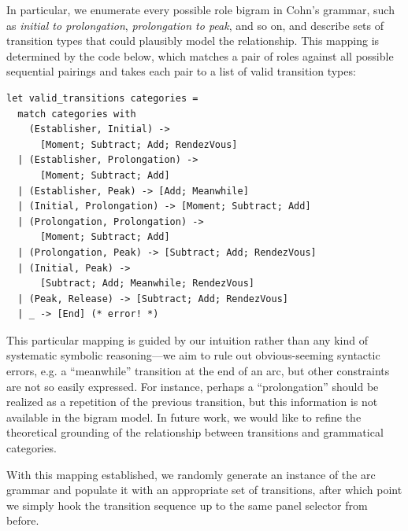 
In particular, we enumerate every possible role bigram in Cohn's grammar,
such as {\em initial to prolongation}, {\em prolongation to peak}, and so
on, and describe sets of transition types that could plausibly model the
relationship. This mapping is determined by the code below, which matches a
pair of roles against all possible sequential pairings and takes each pair
to a list of valid transition types:

\begin{Verbatim}[fontsize=\scriptsize]
let valid_transitions categories =
  match categories with
    (Establisher, Initial) -> 
      [Moment; Subtract; Add; RendezVous]
  | (Establisher, Prolongation) -> 
      [Moment; Subtract; Add]
  | (Establisher, Peak) -> [Add; Meanwhile]
  | (Initial, Prolongation) -> [Moment; Subtract; Add]
  | (Prolongation, Prolongation) -> 
      [Moment; Subtract; Add]
  | (Prolongation, Peak) -> [Subtract; Add; RendezVous]
  | (Initial, Peak) -> 
      [Subtract; Add; Meanwhile; RendezVous]
  | (Peak, Release) -> [Subtract; Add; RendezVous]
  | _ -> [End] (* error! *)
\end{Verbatim}

This particular mapping is guided by our intuition rather than any kind of
systematic symbolic reasoning---we aim to rule out obvious-seeming
syntactic errors, e.g. a ``meanwhile'' transition at the end of an arc, but
other constraints are not so easily expressed. For instance, perhaps a
``prolongation'' should be realized as a repetition of the previous
transition, but this information is not available in the bigram model. In
future work, we would like to refine the theoretical grounding of the
relationship between transitions and grammatical categories.

With this mapping established, we randomly generate an instance of the
arc grammar and populate it with an appropriate set of transitions, after
which point we simply hook the transition sequence up to the same panel
selector from before.

